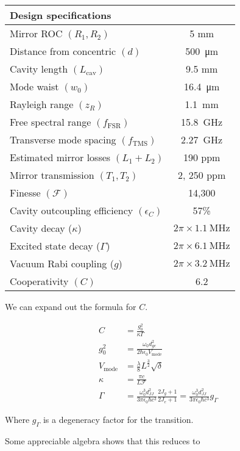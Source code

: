 \documentclass[12pt]{article}
\newcommand{\ep}{\epsilon}
\begin{document}
\begin{tabular}{|l|c|}
\hline
\multicolumn{2}{|l|}{\textbf{Design specifications}}
\\\hline\hline
Mirror ROC $(R_1, R_2)$ & 5 mm\\\hline
Distance from concentric $(d)$ & \SI{500}{\um}\\\hline
Cavity length $(L_{\text{cav}})$& 9.5 mm\\\hline
Mode waist $(w_0)$ & \SI{16.4}{\um}\\\hline
Rayleigh range $(z_R)$ & \SI{1.1}{\mm}\\\hline
Free spectral range $(f_{\text{FSR}})$ & \SI{15.8}{GHz}\\\hline
Transverse mode spacing $(f_{\text{TMS}})$ & \SI{2.27}{GHz}\\\hline
Estimated mirror losses $(L_1 + L_2)$ & 190 ppm\\\hline
Mirror transmission $(T_1, T_2)$ & 2, 250 ppm\\\hline
Finesse $(\mathcal{F})$ & 14,300\\\hline
Cavity outcoupling efficiency $(\ep_{C})$ & 57\%\\\hline
Cavity decay ($\kappa$) & $2\pi\times \SI{1.1}{\MHz}$\\\hline
Excited state decay ($\Gamma$) & $2\pi\times \SI{6.1}{\MHz}$\\\hline
Vacuum Rabi coupling ($g$) & $2\pi\times \SI{3.2}{\MHz}$\\\hline
Cooperativity $(C)$ & 6.2\\\hline
\end{tabular}

We can expand out the formula for $C$.

\begin{align}
C &= \frac{g_0^2}{\kappa \Gamma}\\
g_0^2 &= \frac{\omega_0 d_{ge}^2}{2\hbar \ep_0 V_{\text{mode}}}\\
V_{\text{mode}} &= \frac{\lambda}{8} L^{\frac{3}{2}}\sqrt{\delta}\\
\kappa &= \frac{\pi c}{L\mathcal{F}}\\
\Gamma &= \frac{\omega_0^3 d_{JJ}^2}{3 \pi \ep_0 \hbar c^3} \frac{2J_g + 1}{2J_e + 1} = \frac{\omega_0^3 d_{JJ}^2}{3 \pi \ep_0 \hbar c^3} g_{\Gamma}
\end{align}

Where $g_{\Gamma}$ is a degeneracy factor for the transition.

Some appreciable algebra shows that this reduces to
\end{document}
